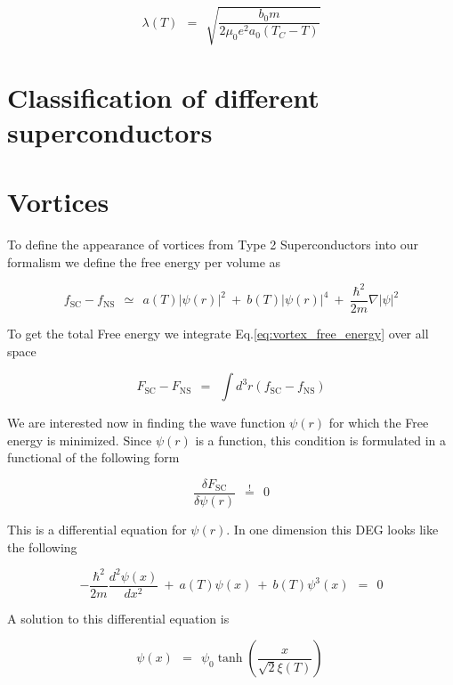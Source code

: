 \documentclass[10pt]{report}
\numberwithin{equation}{chapter}
\newcommand{\myEq}[1]{
  Eq.\ref{#1}
}
\begin{document}
\begin{equation} \label{eq:penetration_depth_temp_dep}
  \lambda(T) ~~=~~ \sqrt{\frac{b_0 m}{2 \mu_0 e^2 a_0 (T_C-T)}}
\end{equation}

\section{Classification of different superconductors}


\section{Vortices}

To define the appearance of vortices from Type 2 Superconductors into our formalism we define the free energy per volume as

\begin{equation} \label{eq:vortex_free_energy}
  f_\text{SC} - f_\text{NS} ~~≃~~ a(T) |\psi(r)|^2 ~+~ b(T)|\psi(r)|^4 ~+~ 
  \frac{\hbar^2}{2m} \nabla |\psi|^2
\end{equation}

To get the total Free energy we integrate \myEq{eq:vortex_free_energy} over all space

\begin{equation}
  F_\text{SC} - F_\text{NS} ~~=~~ \int d^3r (f_\text{SC} - f_\text{NS})
\end{equation}

We are interested now in finding the wave function $\psi(r)$ for which the Free energy is minimized. Since $\psi(r)$ is a function, this condition is formulated in a functional of the following form

\begin{equation}
  \frac{\delta F_\text{SC}}{\delta \psi(r)} ~~\overset{!}{=}~~ 0
\end{equation}

This is a differential equation for $\psi(r)$. In one dimension this DEG looks like the following

\begin{equation} \label{eq:vortex_wave_function_deg}
  -\frac{\hbar^2}{2m} \frac{d^2\psi(x)}{dx^2} ~+~ a(T) \psi(x) ~+~ b(T) \psi^3(x) ~~=~~ 0
\end{equation}

A solution to this differential equation is

\begin{equation} \label{eq:vortex_wave_function}
  \psi(x) ~~=~~ \psi_0 \tanh(\frac{x}{\sqrt{2} \xi(T)})
  \ 
\end{equation}
\end{document}
